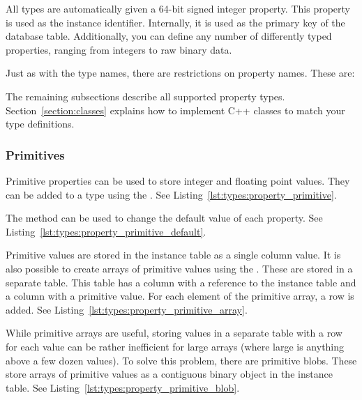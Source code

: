 
All types are automatically given a 64-bit signed integer property. This property is used as the instance identifier. Internally, it is used as the primary key of the database table. Additionally, you can define any number of differently typed properties, ranging from integers to raw binary data.

Just as with the type names, there are restrictions on property names. These are: %

The remaining subsections describe all supported property types. Section~\ref{section:classes} explains how to implement C++ classes to match your type definitions.

\subsubsection{Primitives}
\label{section:types:property_types:primitives}

Primitive properties can be used to store integer and floating point values. They can be added to a type using the . See Listing~\ref{lst:types:property_primitive}.



The  method can be used to change the default value of each property. See Listing~\ref{lst:types:property_primitive_default}.



Primitive values are stored in the instance table as a single column value. It is also possible to create arrays of primitive values using the . These are stored in a separate table. This table has a column with a reference to the instance table and a column with a primitive value. For each element of the primitive array, a row is added. See Listing~\ref{lst:types:property_primitive_array}.



While primitive arrays are useful, storing values in a separate table with a row for each value can be rather inefficient for large arrays (where large is anything above a few dozen values). To solve this problem, there are primitive blobs. These store arrays of primitive values as a contiguous binary object in the instance table. See Listing~\ref{lst:types:property_primitive_blob}.

